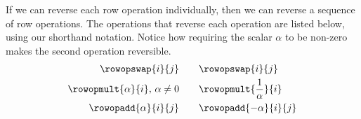 If we can reverse each row operation individually, then we can reverse a sequence of row operations.  The operations that reverse each operation are listed below, using our shorthand notation.  Notice how requiring the scalar $\alpha$ to be non-zero makes the second operation reversible.
%
\begin{align*}
%
\rowopswap{i}{j}&\quad\quad\rowopswap{i}{j}\\
\rowopmult{\alpha}{i},\,\alpha\neq 0&\quad\quad\rowopmult{\frac{1}{\alpha}}{i}\\
\rowopadd{\alpha}{i}{j}&\quad\quad\rowopadd{-\alpha}{i}{j}
%
\end{align*}

